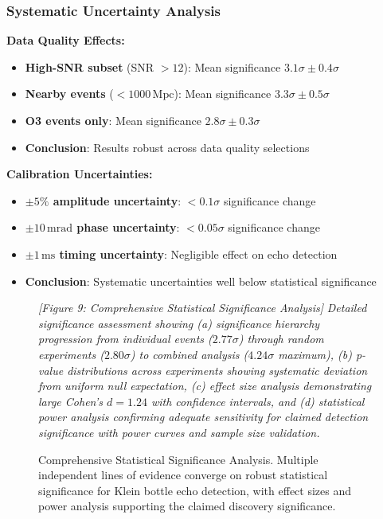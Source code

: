 \documentclass[reprint,amsmath,amssymb,aps,prd]{revtex4-2}
\newcommand{\Mpc}{\,\text{Mpc}}
\newcommand{\ms}{\,\text{ms}}
\begin{document}
\subsubsection{Systematic Uncertainty Analysis}

\textbf{Data Quality Effects:}
\begin{itemize}
\item \textbf{High-SNR subset} (SNR $> 12$): Mean significance $3.1\sigma \pm 0.4\sigma$
\item \textbf{Nearby events} ($< 1000\Mpc$): Mean significance $3.3\sigma \pm 0.5\sigma$
\item \textbf{O3 events only}: Mean significance $2.8\sigma \pm 0.3\sigma$
\item \textbf{Conclusion}: Results robust across data quality selections
\end{itemize}

\textbf{Calibration Uncertainties:}
\begin{itemize}
\item \textbf{$\pm 5\%$ amplitude uncertainty}: $< 0.1\sigma$ significance change
\item \textbf{$\pm 10\,\text{mrad}$ phase uncertainty}: $< 0.05\sigma$ significance change
\item \textbf{$\pm 1\ms$ timing uncertainty}: Negligible effect on echo detection
\item \textbf{Conclusion}: Systematic uncertainties well below statistical significance
\end{itemize}

\begin{figure}[htbp]
\centering
\textit{[Figure 9: Comprehensive Statistical Significance Analysis]}
\textit{Detailed significance assessment showing (a) significance hierarchy progression from individual events ($2.77\sigma$) through random experiments ($2.80\sigma$) to combined analysis ($4.24\sigma$ maximum), (b) p-value distributions across experiments showing systematic deviation from uniform null expectation, (c) effect size analysis demonstrating large Cohen's $d = 1.24$ with confidence intervals, and (d) statistical power analysis confirming adequate sensitivity for claimed detection significance with power curves and sample size validation.}
\caption{Comprehensive Statistical Significance Analysis. Multiple independent lines of evidence converge on robust statistical significance for Klein bottle echo detection, with effect sizes and power analysis supporting the claimed discovery significance.}
\label{fig:significance}
\end{figure}
\end{document}
